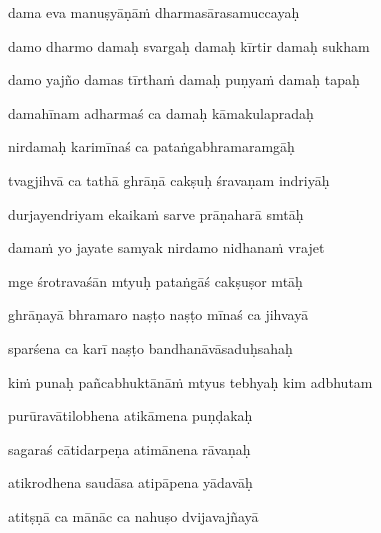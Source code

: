 dama eva manuṣyāṇā\.m dharmasārasamuccayaḥ \veg\dontdisplaylinenum

damo dharmo damaḥ svargaḥ damaḥ kīrtir damaḥ sukham\thinspace{\dandab} \dontdisplaylinenum

damo yajño damas tīrtha\.m damaḥ puṇya\.m damaḥ tapaḥ \veg\dontdisplaylinenum

damahīnam adharmaś ca damaḥ kāmakulapradaḥ\thinspace{\dandab} \dontdisplaylinenum

nirdamaḥ karimīnaś ca pataṅgabhramaramgāḥ \veg\dontdisplaylinenum

tvagjihvā ca tathā ghrāṇā cakṣuḥ śravaṇam indriyāḥ\thinspace{\dandab} \dontdisplaylinenum

durjayendriyam ekaika\.m sarve prāṇaharā smtāḥ \veg\dontdisplaylinenum

dama\.m yo jayate samyak nirdamo nidhana\.m vrajet\thinspace{\dandab} \dontdisplaylinenum

mge śrotravaśān mtyuḥ pataṅgāś cakṣuṣor mtāḥ \veg\dontdisplaylinenum

ghrāṇayā bhramaro naṣṭo naṣṭo mīnaś ca jihvayā\thinspace{\dandab} \dontdisplaylinenum

sparśena ca karī naṣṭo bandhanāvāsaduḥsahaḥ \veg\dontdisplaylinenum

ki\.m punaḥ pañcabhuktānā\.m mtyus tebhyaḥ kim adbhutam\thinspace{\dandab} \dontdisplaylinenum

purūravātilobhena atikāmena puṇḍakaḥ \veg\dontdisplaylinenum

sagaraś cātidarpeṇa atimānena rāvaṇaḥ\thinspace{\dandab} \dontdisplaylinenum

atikrodhena saudāsa atipāpena yādavāḥ \veg\dontdisplaylinenum

atitṣṇā ca mānāc ca nahuṣo dvijavajñayā\thinspace{\dandab} \dontdisplaylinenum

